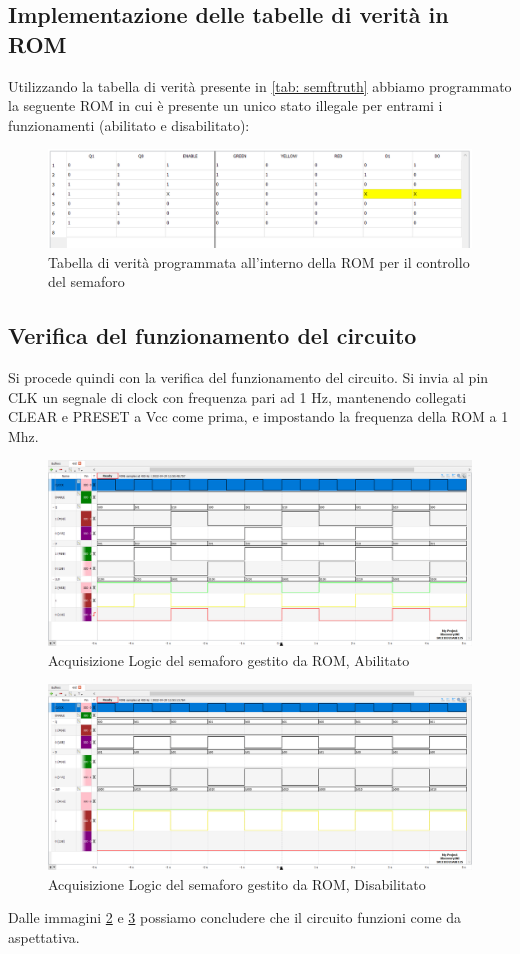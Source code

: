 \documentclass[10pt, a4paper, italian]{article}
\begin{document}
\subsection{Implementazione delle tabelle di verità in ROM}
Utilizzando la tabella di verità presente in \cref{tab: semftruth} abbiamo programmato la seguente ROM in cui è presente un unico stato illegale per entrami i funzionamenti (abilitato e disabilitato):
\begin{figure}[htbp]
    \centering
    \includegraphics[width=\textwidth]{ROM.1}
    \caption{Tabella di verità programmata all'interno della ROM per il controllo del semaforo
    \label{fig: rom}}
\end{figure}

\subsection{Verifica del funzionamento del circuito}
Si procede quindi con la verifica del funzionamento del circuito.
Si invia al pin CLK un segnale di clock con frequenza pari ad 1 Hz, mantenendo collegati CLEAR e PRESET a Vcc come prima, e impostando la frequenza della ROM a 1 Mhz.
\begin{figure}[htbp]
    \centering
    \includegraphics[width=\textwidth]{es2.enable}
    \caption{Acquisizione Logic del semaforo gestito da ROM, Abilitato
    \label{fig: es.2_enable}}
\end{figure}
\begin{figure}[htbp]
    \centering
    \includegraphics[width=\textwidth]{es2.disable}
    \caption{Acquisizione Logic del semaforo gestito da ROM, Disabilitato
    \label{fig: es.2_disable}}
\end{figure}
Dalle immagini \ref{fig: es.2_enable} e \ref{fig: es.2_disable} possiamo concludere che il circuito funzioni come da aspettativa.
\end{document}
